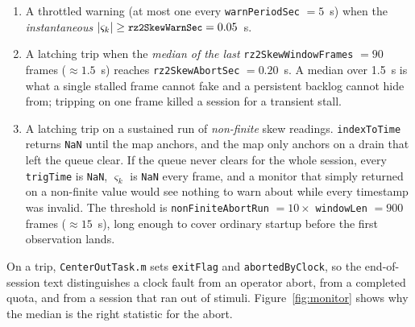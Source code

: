 \documentclass[11pt,a4paper]{article}
\newcommand{\code}[1]{\texttt{\small #1}}
\newcommand{\file}[1]{\texttt{\small #1}}
\begin{document}
\begin{enumerate}[leftmargin=*,itemsep=2pt]
\item A throttled warning (at most one every \code{warnPeriodSec} $=5$~s) when
the \emph{instantaneous} $|\varsigma_k| \ge \code{rz2SkewWarnSec} = 0.05$~s.
\item A latching trip when the \emph{median of the last}
\code{rz2SkewWindowFrames} $= 90$ frames ($\approx 1.5$~s) reaches
\code{rz2SkewAbortSec} $= 0.20$~s. A median over 1.5~s is what a single stalled
frame cannot fake and a persistent backlog cannot hide from; tripping on one
frame killed a session for a transient stall.
\item A latching trip on a sustained run of \emph{non-finite} skew readings.
\code{indexToTime} returns \code{NaN} until the map anchors, and the map only
anchors on a drain that left the queue clear. If the queue never clears for the
whole session, every \code{trigTime} is \code{NaN}, $\varsigma_k$ is \code{NaN}
every frame, and a monitor that simply returned on a non-finite value would see
nothing to warn about while every timestamp was invalid. The threshold is
\code{nonFiniteAbortRun} $= 10 \times$ \code{windowLen} $= 900$ frames
($\approx 15$~s), long enough to cover ordinary startup before the first
observation lands.
\end{enumerate}

On a trip, \file{CenterOutTask.m} sets \code{exitFlag} and
\code{abortedByClock}, so the end-of-session text distinguishes a clock fault
from an operator abort, from a completed quota, and from a session that ran out
of stimuli. Figure~\ref{fig:monitor} shows why the median is the right statistic
for the abort.
\end{document}
